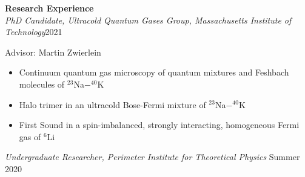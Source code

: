 \documentclass[10pt]{article}
\begin{document}
	







\noindent \large{\textbf{{Research Experience}}}   \normalsize \\  

\vspace{-5pt}
\noindent \textit{PhD Candidate, Ultracold Quantum Gases Group, Massachusetts Institute of Technology}\hfill 2021\textendash

\vspace{2pt}
Advisor: Martin Zwierlein 
\vspace{-5pt}
\begin{itemize}
	\setlength\itemsep{-4pt}
	\item Continuum quantum gas microscopy of quantum mixtures and Feshbach molecules of $^{23}$Na$-^{40}$K
	\item Halo trimer in an ultracold Bose-Fermi mixture of $^{23}$Na$-^{40}$K
	\item First Sound in a spin-imbalanced, strongly interacting, homogeneous Fermi gas of $^{6}$Li
\end{itemize}

\noindent \textit{Undergraduate Researcher, Perimeter Institute for Theoretical Physics} \hfill Summer 2020
\end{document}
